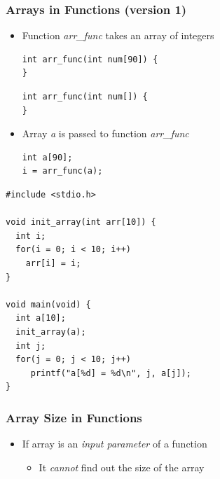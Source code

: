 \documentclass{../c-lecture}
\begin{document}
\begin{frame}[fragile]
  \frametitle{Arrays in Functions (version 1)}
  \begin{itemize}
    \item
      Function \textit{\color{Orange} arr\_func} takes an array of
      integers
    \begin{verbatim}
int arr_func(int num[90]) {
}
    \end{verbatim}
    \begin{verbatim}
int arr_func(int num[]) {
}
    \end{verbatim}
    \item
      Array \textit{\color{Orange}a} is passed to function
      \textit{\color{Orange} arr\_func}
    \begin{verbatim}
int a[90];
i = arr_func(a);
    \end{verbatim}
  \end{itemize}
\end{frame}

\begin{frame}[fragile]
  \scriptsize
  \begin{verbatim}
#include <stdio.h>

void init_array(int arr[10]) {
  int i;
  for(i = 0; i < 10; i++)
    arr[i] = i;
}

void main(void) {
  int a[10];
  init_array(a);
  int j;
  for(j = 0; j < 10; j++)
     printf("a[%d] = %d\n", j, a[j]);
}
  \end{verbatim}
\end{frame}

\begin{frame}
  \frametitle{Array Size in Functions}
  \begin{block}{}
    \begin{itemize}
      \item
        If array is an \textit{\color{Orange} input parameter} of a
        function
      \begin{itemize}
        \item
          It \textit{\color{RubineRed} cannot} find out the size of the array
      \end{itemize}
    \end{itemize}
  \end{block}
\end{frame}
\end{document}
